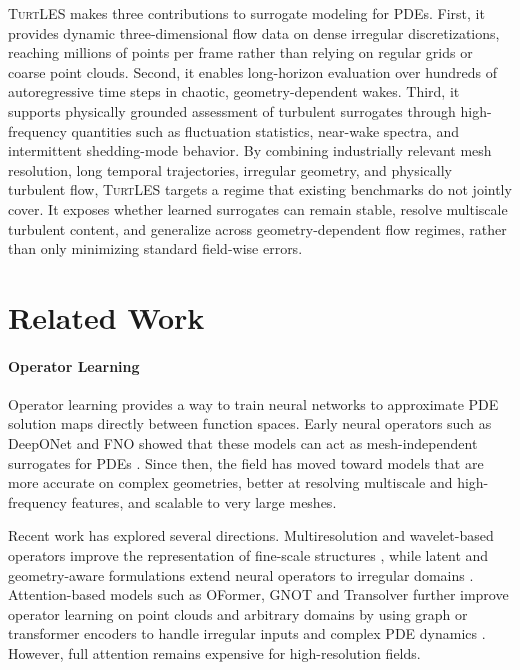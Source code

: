 \documentclass{article}
\begin{document}
\textsc{TurtLES} makes three contributions to surrogate modeling for PDEs. First, it provides dynamic three-dimensional flow data on dense irregular discretizations, reaching millions of points per frame rather than relying on regular grids or coarse point clouds. Second, it enables long-horizon evaluation over hundreds of autoregressive time steps in chaotic, geometry-dependent wakes. Third, it supports physically grounded assessment of turbulent surrogates through high-frequency quantities such as fluctuation statistics, near-wake spectra, and intermittent shedding-mode behavior. By combining \textcolor{revcolor}{industrially relevant mesh resolution}, long temporal trajectories, irregular geometry, and physically turbulent flow, \textsc{TurtLES} targets a regime that existing benchmarks do not jointly cover. It exposes whether learned surrogates can remain stable, resolve multiscale turbulent content, and generalize across geometry-dependent flow regimes, rather than only minimizing standard field-wise errors.


\section{Related Work}
\paragraph{Operator Learning}
Operator learning provides a way to train neural networks to approximate PDE solution maps directly between function spaces. Early neural operators such as DeepONet and FNO showed that these models can act as mesh-independent surrogates for PDEs \citep{Lu2019,li2020fourier}. Since then, the field has moved toward models that are more accurate on complex geometries, better at resolving multiscale and high-frequency features, and scalable to very large meshes.

Recent work has explored several directions. Multiresolution and wavelet-based operators improve the representation of fine-scale structures \citep{gupta2021multiwavelet}, while latent and geometry-aware formulations extend neural operators to irregular domains \citep{Tran2023ffno,li2023geometry}. Attention-based models such as OFormer, GNOT and Transolver further improve operator learning on point clouds and arbitrary domains by using graph or transformer encoders to handle irregular inputs and complex PDE dynamics \citep{li2023transformer,hao2023gnot,Wu2024}. However, full attention remains expensive for high-resolution fields.
\end{document}
